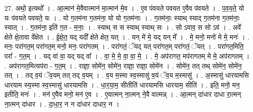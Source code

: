 \documentclass[17pt]{extarticle}
\begin{document}
27. अथो॒ इत्यथो᳚ । . आ॒त्मान॑ मे॒वैवात्मान॑ मा॒त्मान॑ मे॒व । . ए॒व प॑वयते पवयत ए॒वैव प॑वयते । . प॒व॒य॒ते॒ यो यः प॑वयते पवयते॒ यः । . यो ग॒तम॑ना ग॒तम॑ना॒ यो यो ग॒तम॑नाः । . ग॒तम॑नाः॒ स्याथ् स्याद् ग॒तम॑ना ग॒तम॑नाः॒ स्यात् । . ग॒तम॑ना॒ इति॑ ग॒त - म॒नाः॒ । . स्याथ् स स स्याथ् स्याथ् सः । . सो ऽवाव॒ स सो ऽव॑ । . अवे᳚ क्षेते क्षे॒तावा वे᳚क्षेत । . ई॒क्षे॒त॒ यद् यदी᳚ क्षेते क्षेत॒ यत् । . यन् मे॑ मे॒ यद् यन् मे᳚ । . मे॒ मनो॒ मनो॑ मे मे॒ मनः॑ । . मनः॒ परा॑गत॒म् परा॑गत॒म् मनो॒ मनः॒ परा॑गतम् । . परा॑गतं॒ ॅयद् यत् परा॑गत॒म् परा॑गतं॒ ॅयत् । . परा॑गत॒मिति॒ परा᳚ - ग॒त॒म् । . यद् वा॑ वा॒ यद् यद् वा᳚ । . वा॒ मे॒ मे॒ वा॒ वा॒ मे॒ । . मे॒ अप॑रागत॒ मप॑रागतम् मे मे॒ अप॑रागतम् । . अप॑रागत॒मित्यप॑रा - ग॒त॒म् । . राज्ञा॒ सोमे॑न॒ सोमे॑न॒ राज्ञा॒ राज्ञा॒ सोमे॑न । . सोमे॑न॒ तत् तथ् सोमे॑न॒ सोमे॑न॒ तत् । . तद् व॒यं ॅव॒यम् तत् तद् व॒यम् । . व॒य म॒स्मा स्व॒स्मासु॑ व॒यं ॅव॒य म॒स्मासु॑ । . अ॒स्मासु॑ धारयामसि धारयाम स्य॒स्मा स्व॒स्मासु॑ धारयामसि । . धा॒र॒या॒म॒ सीतीति॑ धारयामसि धारयाम॒ सीति॑ । . इति॒ मनो॒ मन॒ इतीति॒ मनः॑ । . मन॑ ए॒वैव मनो॒ मन॑ ए॒व । . ए॒वात्मन् ना॒त्मन् ने॒वै वात्मन्न् । . आ॒त्मन् दा॑धार दाधा रा॒त्मन् ना॒त्मन् दा॑धार । . दा॒धा॒र॒ न न दा॑धार दाधार॒ न । \newline
\end{document}

